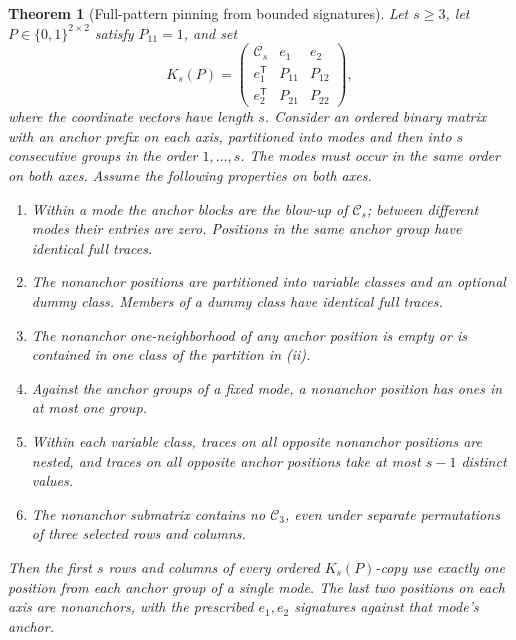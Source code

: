 \documentclass[11pt]{article}
\newtheorem{theorem}{Theorem}[section]
\theoremstyle{definition}
\newcommand{\crown}{\mathcal C}
\begin{document}
\begin{theorem}[Full-pattern pinning from bounded signatures]
\label{thm:pinning}
Let \(s\ge3\), let \(P\in\{0,1\}^{2\times2}\) satisfy \(P_{11}=1\),
and set
\begin{equation}
 K_s(P)=\begin{pmatrix}
 \crown_s&e_1&e_2\\
 e_1^{\mathsf T}&P_{11}&P_{12}\\
 e_2^{\mathsf T}&P_{21}&P_{22}
 \end{pmatrix},
 \label{eq:general-pattern}
\end{equation}
where the coordinate vectors have length \(s\). Consider an ordered
binary matrix with an anchor prefix on each axis, partitioned into
modes and then into \(s\) consecutive groups in the order
\(1,\ldots,s\). The modes must occur in the same order on both axes.
Assume the following properties on both axes.
\begin{enumerate}[label=\textnormal{(\roman*)}]
\item Within a mode the anchor blocks are the blow-up of \(\crown_s\);
between different modes their entries are zero. Positions in the same
anchor group have identical full traces.
\item The nonanchor positions are partitioned into variable classes and
an optional dummy class. Members of a dummy class have identical full
traces.
\item The nonanchor one-neighborhood of any anchor position is empty or
is contained in one class of the partition in (ii).
\item Against the anchor groups of a fixed mode, a nonanchor position has
ones in at most one group.
\item Within each variable class, traces on all opposite nonanchor
positions are nested, and traces on all opposite anchor positions take
at most \(s-1\) distinct values.
\item The nonanchor submatrix contains no \(\crown_3\), even under
separate permutations of three selected rows and columns.
\end{enumerate}
Then the first \(s\) rows and columns of every ordered \(K_s(P)\)-copy
use exactly one position from each anchor group of a single mode.
The last two positions on each axis are nonanchors, with the prescribed
\(e_1,e_2\) signatures against that mode's anchor.
\end{theorem}
\end{document}
